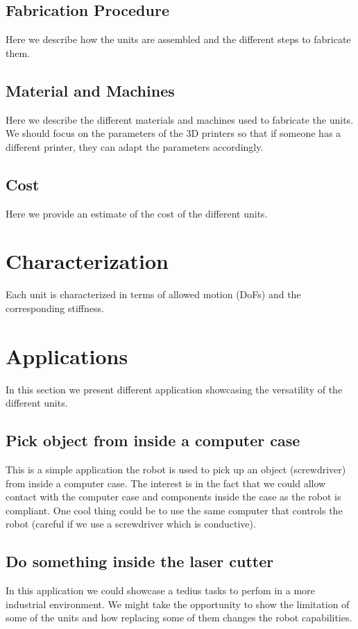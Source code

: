 \documentclass[12pt]{article}
\begin{document}
\subsection{Fabrication Procedure}
Here we describe how the units are assembled and the different steps to fabricate them.

\subsection{Material and Machines}
Here we describe the different materials and machines used to fabricate the units.
We should focus on the parameters of the 3D printers so that if someone has a different printer, they can adapt the parameters accordingly.

\subsection{Cost} 
Here we provide an estimate of the cost of the different units.

\section{Characterization}
Each unit is characterized in terms of allowed motion (DoFs) and the corresponding stiffness.


\section{Applications}
In this section we present different application showcasing the versatility of the different units.

\subsection{Pick object from inside a computer case}
This is a simple application the robot is used to pick up an object (screwdriver) from inside a computer case.
The interest is in the fact that we could allow contact with the computer case and components inside the case as the robot is compliant.
One cool thing could be to use the same computer that controls the robot (careful if we use a screwdriver which is conductive).

\subsection{Do something inside the laser cutter}
In this application we could showcase a tedius tasks to perfom in a more industrial environment.
We might take the opportunity to show the limitation of some of the units and how replacing some of them changes the robot capabilities.
\end{document}
